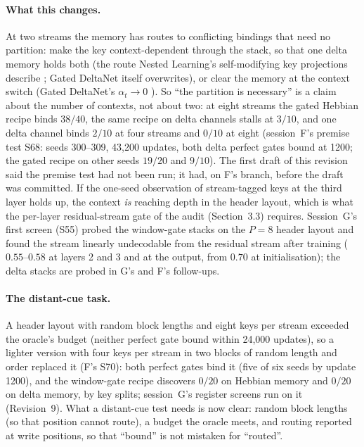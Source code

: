 \documentclass[11pt]{article}
\begin{document}
\paragraph{What this changes.} At two streams the memory has routes to conflicting bindings that need no partition: make the key context-dependent through the stack, so that one delta memory holds both (the route Nested Learning's self-modifying key projections describe \cite{nested}; Gated DeltaNet itself overwrites), or clear the memory at the context switch (Gated DeltaNet's $\alpha_t \to 0$ \cite{gdn}). So ``the partition is necessary'' is a claim about the number of contexts, not about two: at eight streams the gated Hebbian recipe binds $38/40$, the same recipe on delta channels stalls at $3/10$, and one delta channel binds $2/10$ at four streams and $0/10$ at eight (session~F's premise test S68: seeds 300--309, 43{,}200 updates, both delta perfect gates bound at 1200; the gated recipe on other seeds $19/20$ and $9/10$). The first draft of this revision said the premise test had not been run; it had, on F's branch, before the draft was committed. If the one-seed observation of stream-tagged keys at the third layer holds up, the context \emph{is} reaching depth in the header layout, which is what the per-layer residual-stream gate of the audit (Section~3.3) requires. Session~G's first screen (S55) probed the window-gate stacks on the $P = 8$ header layout and found the stream linearly undecodable from the residual stream after training ($0.55$--$0.58$ at layers 2 and 3 and at the output, from $0.70$ at initialisation); the delta stacks are probed in G's and F's follow-ups.

\paragraph{The distant-cue task.} A header layout with random block lengths and eight keys per stream exceeded the oracle's budget (neither perfect gate bound within 24{,}000 updates), so a lighter version with four keys per stream in two blocks of random length and order replaced it (F's S70): both perfect gates bind it (five of six seeds by update 1200), and the window-gate recipe discovers $0/20$ on Hebbian memory and $0/20$ on delta memory, by key splits; session~G's register screens run on it (Revision~9). What a distant-cue test needs is now clear: random block lengths (so that position cannot route), a budget the oracle meets, and routing reported at write positions, so that ``bound'' is not mistaken for ``routed''.
\end{document}
